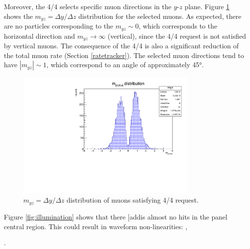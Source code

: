 {Moreover, the 4/4  selects specific
muon directions in the $y$-$z$ plane. 
Figure \ref{fig:myz} shows the 
$m_{yz}=\Delta y /\Delta z$ distribution 
for the selected muons. 
As expected, there are no particles corresponding 
to the $m_{yz}\sim 0$, which corresponds to the  
horizontal direction and 
$m_{yz} \rightarrow \infty$ (vertical), since the 
4/4 request is not satisfied by vertical muons. 
The consequence of the 4/4  is also a 
significant reduction of the total muon rate 
(Section \ref{ratetracker}). 
The selected muon  
directions tend to have  
$|m_{yz}| \sim 1$, which correspond to  
an angle of approximately 45°.
\begin{figure}[!h]
    \centering
    \includegraphics[width =0.8\textwidth]{figures/pdf/myz.pdf}
    \caption[The $y-z$ direction 
    distribution of muons satisfying 4/4 request.]{
        $m_{yz}=\Delta y /\Delta z$  
    distribution of muons satisfying 4/4 request.}
    \label{fig:myz}
\end{figure}

Figure \ref{fig:illumination} 
shows that there [add{is} almost no hits in the 
panel central region. This could result in 
waveform non-linearities: ,

.



}
